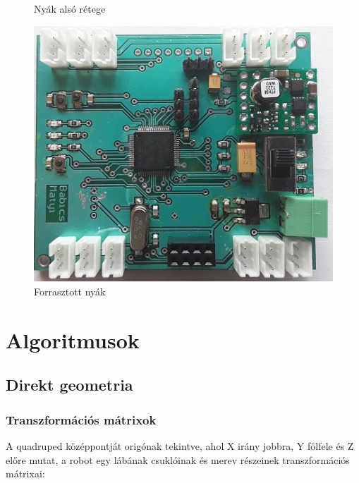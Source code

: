\documentclass{article}
\begin{document}
\begin{figure}[h]
\begin{minipage}{0.3\textwidth}
		\caption{Nyák alsó rétege}
	\end{minipage}\hfill
	\begin{minipage}{0.3\textwidth}
		\centering
		\includegraphics[width=\textwidth]{nyakforr}
		\caption{Forrasztott nyák}
	\end{minipage}
\end{figure}
\section{Algoritmusok}
\subsection{Direkt geometria}
\subsubsection{Transzformációs mátrixok}
A quadruped középpontját origónak tekintve, ahol X irány jobbra, Y fölfele és Z előre mutat, a robot egy lábának csuklóinak és merev részeinek transzformációs mátrixai:
\end{document}
